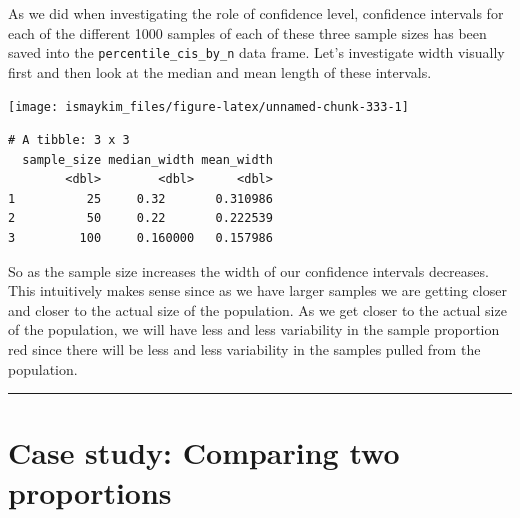 \documentclass[12pt, krantz2,]{krantz}
\makeatletter
\newenvironment{Shaded}{\begin{snugshade}}{\end{snugshade}}
\newcommand{\DataTypeTok}[1]{\textcolor[rgb]{0.27,0.27,0.27}{#1}}
\newcommand{\KeywordTok}[1]{\textcolor[rgb]{0.27,0.27,0.27}{\textbf{#1}}}
\newcommand{\NormalTok}[1]{#1}
\newcommand{\OperatorTok}[1]{\textcolor[rgb]{0.43,0.43,0.43}{\textbf{#1}}}
\newcommand{\StringTok}[1]{\textcolor[rgb]{0.5,0.5,0.5}{#1}}
\newenvironment{kframe}{%
\medskip{}
\setlength{\fboxsep}{.8em}
 \def\at@end@of@kframe{}%
 \ifinner\ifhmode%
  \def\at@end@of@kframe{\end{minipage}}%
  \begin{minipage}{\columnwidth}%
 \fi\fi%
 \def\FrameCommand##1{\hskip\@totalleftmargin \hskip-\fboxsep
 \colorbox{shadecolor}{##1}\hskip-\fboxsep
     \hskip-\linewidth \hskip-\@totalleftmargin \hskip\columnwidth}%
 \MakeFramed {\advance\hsize-\width
   \@totalleftmargin\z@ \linewidth\hsize
   \@setminipage}}%
 {\par\unskip\endMakeFramed%
 \at@end@of@kframe}
\renewenvironment{Shaded}{\begin{kframe}}{\end{kframe}}
\makeatother
\begin{document}
As we did when investigating the role of confidence level, confidence intervals for each of the different 1000 samples of each of these three sample sizes has been saved into the \texttt{percentile\_cis\_by\_n} data frame. Let's investigate width visually first and then look at the median and mean length of these intervals.

\begin{center}\texttt{[image: ismaykim\_files/figure-latex/unnamed-chunk-333-1]} \end{center}

\begin{Shaded}
\end{Shaded}

\begin{verbatim}
# A tibble: 3 x 3
  sample_size median_width mean_width
        <dbl>        <dbl>      <dbl>
1          25     0.32       0.310986
2          50     0.22       0.222539
3         100     0.160000   0.157986
\end{verbatim}

So as the sample size increases the width of our confidence intervals decreases. This intuitively makes sense since as we have larger samples we are getting closer and closer to the actual size of the population. As we get closer to the actual size of the population, we will have less and less variability in the sample proportion red since there will be less and less variability in the samples pulled from the population.

\begin{center}\rule{0.5\linewidth}{\linethickness}\end{center}

\hypertarget{case-study-two-prop-ci}{%
\section{Case study: Comparing two proportions}\label{case-study-two-prop-ci}}
\end{document}
